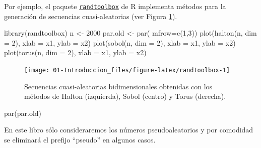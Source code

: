 \documentclass[
]{book}
\newenvironment{Shaded}{\begin{snugshade}}{\end{snugshade}}
\newcommand{\AttributeTok}[1]{\textcolor[rgb]{0.77,0.63,0.00}{#1}}
\newcommand{\DecValTok}[1]{\textcolor[rgb]{0.00,0.00,0.81}{#1}}
\newcommand{\FunctionTok}[1]{\textcolor[rgb]{0.00,0.00,0.00}{#1}}
\newcommand{\NormalTok}[1]{#1}
\newcommand{\OtherTok}[1]{\textcolor[rgb]{0.56,0.35,0.01}{#1}}
\newcommand{\StringTok}[1]{\textcolor[rgb]{0.31,0.60,0.02}{#1}}
\theoremstyle{break}
\theoremstyle{nonumberplain}
\begin{document}
Por ejemplo, el paquete \href{https://CRAN.R-project.org/package=randtoolbox}{\texttt{randtoolbox}} de R implementa métodos para la generación de secuencias cuasi-aleatorias (ver Figura \ref{fig:randtoolbox}).

\begin{Shaded}
\begin{Highlighting}[]
\FunctionTok{library}\NormalTok{(randtoolbox)}
\NormalTok{n }\OtherTok{\textless{}{-}} \DecValTok{2000}
\NormalTok{par.old }\OtherTok{\textless{}{-}} \FunctionTok{par}\NormalTok{( }\AttributeTok{mfrow=}\FunctionTok{c}\NormalTok{(}\DecValTok{1}\NormalTok{,}\DecValTok{3}\NormalTok{))}
\FunctionTok{plot}\NormalTok{(}\FunctionTok{halton}\NormalTok{(n, }\AttributeTok{dim =} \DecValTok{2}\NormalTok{), }\AttributeTok{xlab =} \StringTok{\textquotesingle{}x1\textquotesingle{}}\NormalTok{, }\AttributeTok{ylab =} \StringTok{\textquotesingle{}x2\textquotesingle{}}\NormalTok{)}
\FunctionTok{plot}\NormalTok{(}\FunctionTok{sobol}\NormalTok{(n, }\AttributeTok{dim =} \DecValTok{2}\NormalTok{), }\AttributeTok{xlab =} \StringTok{\textquotesingle{}x1\textquotesingle{}}\NormalTok{, }\AttributeTok{ylab =} \StringTok{\textquotesingle{}x2\textquotesingle{}}\NormalTok{)}
\FunctionTok{plot}\NormalTok{(}\FunctionTok{torus}\NormalTok{(n, }\AttributeTok{dim =} \DecValTok{2}\NormalTok{), }\AttributeTok{xlab =} \StringTok{\textquotesingle{}x1\textquotesingle{}}\NormalTok{, }\AttributeTok{ylab =} \StringTok{\textquotesingle{}x2\textquotesingle{}}\NormalTok{)}
\end{Highlighting}
\end{Shaded}

\begin{figure}[!htb]

{\centering \texttt{[image: 01-Introduccion\_files/figure-latex/randtoolbox-1]} 

}

\caption{Secuencias cuasi-aleatorias bidimensionales obtenidas con los métodos de Halton (izquierda), Sobol (centro) y Torus (derecha).}\label{fig:randtoolbox}
\end{figure}

\begin{Shaded}
\begin{Highlighting}[]
\FunctionTok{par}\NormalTok{(par.old)}
\end{Highlighting}
\end{Shaded}

En este libro sólo consideraremos los números pseudoaleatorios y por comodidad se eliminará el prefijo ``pseudo'' en algunos casos.
\end{document}

